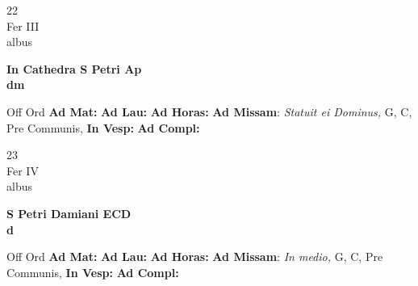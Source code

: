 \documentclass[10pt, openany]{book}
\begin{document}
        \begin{center}
            \begin{minipage}{3.5in}
                \vspace{2em}
                \begin{minipage}{0.5in}
                    {\Huge 22} \\
                    {\normalsize Fer III} \\
                    {\normalsize albus}
                \end{minipage}
                \begin{minipage}{3.0in}
                    \textbf{ \large In Cathedra S Petri Ap \\
                    \textnormal{\normalsize dm}} \\ 
                \end{minipage}
                \begin{justify}Off Ord
                    \textbf{Ad Mat: }
                    \textbf{Ad Lau: }
                    \textbf{Ad Horas: }\textbf{Ad Missam}: \textit{Statuit ei Dominus,} G, C, Pre Communis,  
                    \textbf{In Vesp: }
                    \textbf{Ad Compl: }
                \end{justify}
            \end{minipage}
        \end{center}
    
        \begin{center}
            \begin{minipage}{3.5in}
                \vspace{2em}
                \begin{minipage}{0.5in}
                    {\Huge 23} \\
                    {\normalsize Fer IV} \\
                    {\normalsize albus}
                \end{minipage}
                \begin{minipage}{3.0in}
                    \textbf{ \large S Petri Damiani ECD \\
                    \textnormal{\normalsize d}} \\ 
                \end{minipage}
                \begin{justify}Off Ord
                    \textbf{Ad Mat: }
                    \textbf{Ad Lau: }
                    \textbf{Ad Horas: }\textbf{Ad Missam}: \textit{In medio,} G, C, Pre Communis,  
                    \textbf{In Vesp: }
                    \textbf{Ad Compl: }
                \end{justify}
            \end{minipage}
        \end{center}
    
\end{document}
